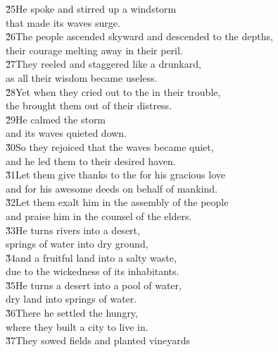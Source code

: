 \begin{poetry}
\poeml \v{25}He spoke and stirred up a windstorm \\
\poemll    that made its waves surge. \\
\poeml \v{26}The people ascended skyward and descended to the depths, \\
\poemll    their courage melting away in their peril. \\
\poeml \v{27}They reeled and staggered like a drunkard, \\
\poemll    as all their wisdom became useless. \\
\poeml \v{28}Yet when they cried out to the  in their trouble, \\
\poemll    the  brought them out of their distress. \\
\poeml \v{29}He calmed the storm \\
\poemll    and its waves quieted down. \\
\poeml \v{30}So they rejoiced that the waves became quiet, \\
\poemll    and he led them to their desired haven. \\
\poeml \v{31}Let them give thanks to the  for his gracious love \\
\poemll    and for his awesome deeds on behalf of mankind. \\
\poeml \v{32}Let them exalt him in the assembly of the people \\
\poemll    and praise him in the counsel of the elders. \\
\poeml \v{33}He turns rivers into a desert, \\
\poemll    springs of water into dry ground, \\
\poeml \v{34}and a fruitful land into a salty waste, \\
\poemll    due to the wickedness of its inhabitants. \\
\poeml \v{35}He turns a desert into a pool of water, \\
\poemll    dry land into springs of water. \\
\poeml \v{36}There he settled the hungry, \\
\poemll    where they built a city to live in. \\
\poeml \v{37}They sowed fields and planted vineyards \\

\end{poetry}
